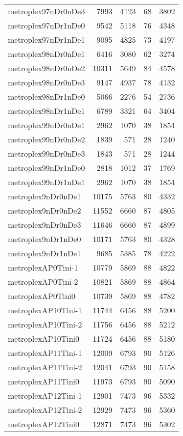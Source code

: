 \documentclass[../../../thesis.tex]{subfiles}
\begin{document}
\begin{longtable}{lrrrr}
metroplex97nDr0nDe3 & 7993 & 4123 & 68 & 3802 \\
metroplex97nDr1nDe0 & 9542 & 5118 & 76 & 4348 \\
metroplex97nDr1nDe1 & 9095 & 4825 & 73 & 4197 \\
metroplex98nDr0nDe1 & 6416 & 3080 & 62 & 3274 \\
metroplex98nDr0nDe2 & 10311 & 5649 & 84 & 4578 \\
metroplex98nDr0nDe3 & 9147 & 4937 & 78 & 4132 \\
metroplex98nDr1nDe0 & 5066 & 2276 & 54 & 2736 \\
metroplex98nDr1nDe1 & 6789 & 3321 & 64 & 3404 \\
metroplex99nDr0nDe1 & 2962 & 1070 & 38 & 1854 \\
metroplex99nDr0nDe2 & 1839 & 571 & 28 & 1240 \\
metroplex99nDr0nDe3 & 1843 & 571 & 28 & 1244 \\
metroplex99nDr1nDe0 & 2818 & 1012 & 37 & 1769 \\
metroplex99nDr1nDe1 & 2962 & 1070 & 38 & 1854 \\
metroplex9nDr0nDe1 & 10175 & 5763 & 80 & 4332 \\
metroplex9nDr0nDe2 & 11552 & 6660 & 87 & 4805 \\
metroplex9nDr0nDe3 & 11646 & 6660 & 87 & 4899 \\
metroplex9nDr1nDe0 & 10171 & 5763 & 80 & 4328 \\
metroplex9nDr1nDe1 & 9685 & 5385 & 78 & 4222 \\
metroplexAP0Tini-1 & 10779 & 5869 & 88 & 4822 \\
metroplexAP0Tini-2 & 10821 & 5869 & 88 & 4864 \\
metroplexAP0Tini0 & 10739 & 5869 & 88 & 4782 \\
metroplexAP10Tini-1 & 11744 & 6456 & 88 & 5200 \\
metroplexAP10Tini-2 & 11756 & 6456 & 88 & 5212 \\
metroplexAP10Tini0 & 11724 & 6456 & 88 & 5180 \\
metroplexAP11Tini-1 & 12009 & 6793 & 90 & 5126 \\
metroplexAP11Tini-2 & 12041 & 6793 & 90 & 5158 \\
metroplexAP11Tini0 & 11973 & 6793 & 90 & 5090 \\
metroplexAP12Tini-1 & 12901 & 7473 & 96 & 5332 \\
metroplexAP12Tini-2 & 12929 & 7473 & 96 & 5360 \\
metroplexAP12Tini0 & 12871 & 7473 & 96 & 5302 \\

\end{longtable}
\end{document}
